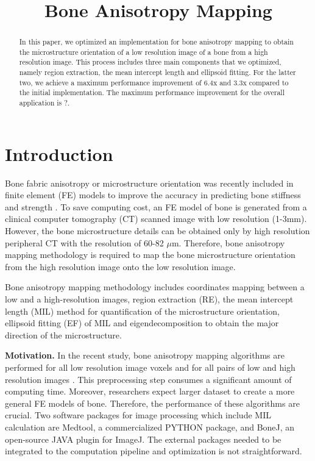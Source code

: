 \documentclass[letterpaper]{article}
\title{Bone Anisotropy Mapping}
\newcommand{\mypar}[1]{{\bf #1.}}
\begin{document}
%
\maketitle
%

\begin{abstract}
In this paper, we optimized an implementation for bone anisotropy mapping to obtain the microstructure orientation of a low resolution image of a bone from a high resolution image. This process includes three main components that we optimized, namely region extraction, the mean intercept length and ellipsoid fitting. For the latter two, we achieve a maximum performance improvement of 6.4x and 3.3x compared to the initial implementation. The maximum performance improvement for the overall application is {\color{red} ?}.
\end{abstract}

\section{Introduction}\label{sec:intro}

Bone fabric anisotropy or microstructure orientation was recently included in finite element (FE) models to improve the accuracy in predicting bone stiffness and strength \cite{Panyasantisuk:18}. To save computing cost, an FE model of bone is generated from a clinical computer tomography (CT) scanned image with low resolution (1-3mm). However, the bone microstructure details can be obtained only by high resolution peripheral CT with the resolution of 60-82 $\mu$m. Therefore, bone anisotropy mapping methodology is required to map the bone microstructure orientation from the high resolution image onto the low resolution image.

Bone anisotropy mapping methodology includes coordinates mapping between a low and a high-resolution images, region extraction (RE), the mean intercept length (MIL) method for quantification of the microstructure orientation, ellipsoid fitting (EF) of MIL and eigendecomposition to obtain the major direction of the microstructure.

\mypar{Motivation} In the recent study, bone anisotropy mapping algorithms are performed for all low resolution image voxels and for all pairs of low and high resolution images \cite{Panyasantisuk:18}. This preprocessing step consumes a significant amount of computing time. Moreover, researchers expect larger dataset to create a more general FE models of bone. Therefore, the performance of these algorithms are crucial. Two software packages for image processing which include MIL calculation are Medtool, a commercialized PYTHON package, and BoneJ, an open-source JAVA plugin for ImageJ. The external packages needed to be integrated to the computation pipeline and optimization is not straightforward. 
\end{document}
